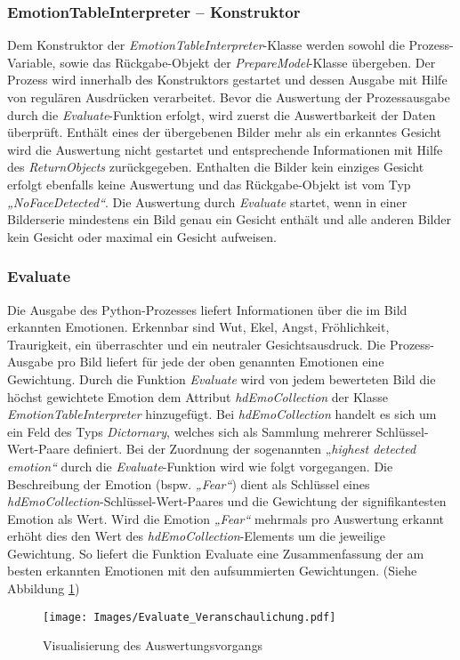 \documentclass[12pt,a4paper,headinclude,twoside, plainheadsepline, open=right,numbers=noenddot]{scrreprt}
\begin{document}
\subsubsection{EmotionTableInterpreter – Konstruktor}
Dem Konstruktor der \textit{EmotionTableInterpreter}-Klasse werden sowohl die Prozess-Variable, sowie das R\"{u}ckgabe-Objekt der \textit{PrepareModel}-Klasse \"{u}bergeben. Der Prozess wird innerhalb des Konstruktors gestartet und dessen Ausgabe mit Hilfe von regul\"{a}ren Ausdr\"{u}cken verarbeitet. Bevor die Auswertung der Prozessausgabe durch die \textit{Evaluate}-Funktion erfolgt, wird zuerst die Auswertbarkeit der Daten \"{u}berpr\"{u}ft. Enth\"{a}lt eines der \"{u}bergebenen Bilder mehr als ein erkanntes Gesicht wird die Auswertung nicht gestartet und entsprechende Informationen mit Hilfe des \textit{ReturnObjects} zur\"{u}ckgegeben. Enthalten die Bilder kein einziges Gesicht erfolgt ebenfalls keine Auswertung und das R\"{u}ckgabe-Objekt ist vom Typ \textit{„NoFaceDetected“}. Die Auswertung durch \textit{Evaluate} startet, wenn in einer Bilderserie mindestens ein Bild genau ein Gesicht enth\"{a}lt und alle anderen Bilder kein Gesicht oder maximal ein Gesicht aufweisen.
\subsubsection{Evaluate}
Die Ausgabe des Python-Prozesses liefert Informationen \"{u}ber die im Bild erkannten Emotionen. Erkennbar sind Wut, Ekel, Angst, Fr\"{o}hlichkeit, Traurigkeit, ein \"{u}berraschter und ein neutraler Gesichtsausdruck. Die Prozess-Ausgabe pro Bild liefert f\"{u}r jede der oben genannten Emotionen eine Gewichtung. Durch die Funktion \textit{Evaluate} wird von jedem bewerteten Bild die h\"{o}chst gewichtete Emotion dem Attribut \textit{hdEmoCollection} der Klasse \textit{EmotionTableInterpreter} hinzugef\"{u}gt. Bei \textit{hdEmoCollection} handelt es sich um ein Feld des Typs \textit{Dictornary}, welches sich als Sammlung mehrerer Schl\"{u}ssel-Wert-Paare definiert. Bei der Zuordnung der sogenannten „\textit{highest detected emotion“} durch die \textit{Evaluate}-Funktion wird wie folgt vorgegangen. Die Beschreibung der Emotion (bspw. \textit{„Fear“}) dient als Schl\"{u}ssel eines \textit{hdEmoCollection}-Schl\"{u}ssel-Wert-Paares und die Gewichtung der signifikantesten Emotion als Wert. Wird die Emotion \textit{„Fear“} mehrmals pro Auswertung erkannt erh\"{o}ht dies den Wert des \textit{hdEmoCollection}-Elements um die jeweilige Gewichtung. So liefert die Funktion Evaluate eine Zusammenfassung der am besten erkannten Emotionen mit den aufsummierten Gewichtungen. (Siehe Abbildung \ref{fig:VisualisierungEvaluation})
 \begin{figure}
 \texttt{[image: Images/Evaluate\_Veranschaulichung.pdf]}
 \caption{Visualisierung des Auswertungsvorgangs}
 \label{fig:VisualisierungEvaluation}
 \end{figure}
\end{document}

